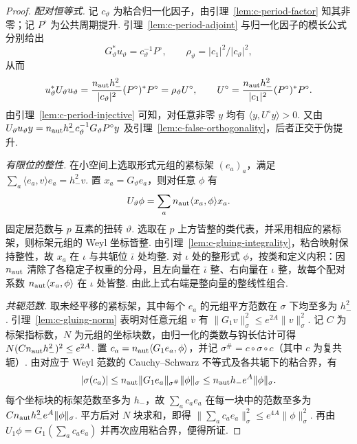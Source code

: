 \begin{proof}
\emph{配对恒等式.}
记 $c_\vartheta$ 为粘合归一化因子，由引理~\ref{lem:c-period-factor} 知其非零；记 $P^\circ$ 为公共周期提升. 引理~\ref{lem:c-period-adjoint} 与归一化因子的模长公式分别给出
\[
 G_\vartheta^*u_\vartheta=c_\vartheta^{-1}P^\circ,
 \qquad
 \rho_\vartheta=|c_1|^2/|c_\vartheta|^2 ,
\]
从而
\[
 u_\vartheta^*U_\vartheta u_\vartheta
  =\frac{n_{\rm aut}h_-^2}{|c_\vartheta|^2}(P^\circ)^*P^\circ
  =\rho_\vartheta U^\circ,\qquad
 U^\circ=\frac{n_{\rm aut}h_-^2}{|c_1|^2}(P^\circ)^*P^\circ .
\]
由引理~\ref{lem:c-period-injective} 可知，对任意非零 $y$ 均有 $\langle y,U^\circ y\rangle>0$. 又由 $U_\vartheta u_\vartheta y=n_{\rm aut}h_-^2 c_\vartheta^{-1}G_\vartheta P^\circ y$ 及引理~\ref{lem:c-false-orthogonality}，后者正交于伪提升.

\emph{有限位的整性.}
在小空间上选取形式元组的紧标架 $(e_a)_a$，满足 $\sum_a\langle e_a,v\rangle e_a=h_-^2v$. 置 $x_a=G_\vartheta e_a$，则对任意 $\phi$ 有
\[
 U_\vartheta\phi=\sum_a n_{\rm aut}\langle x_a,\phi\rangle x_a .
\]
固定层范数与 $p$ 互素的扭转 $\vartheta$. 选取在 $p$ 上方皆整的类代表，并采用相应的紧标架，则标架元组的 Weyl 坐标皆整. 由引理~\ref{lem:c-gluing-integrality}，粘合映射保持整性，故 $x_a$ 在 $\iota$ 与共轭位 $\bar\iota$ 处均整. 对 $\iota$ 处的整形式 $\phi$，按类和定义内积：因 $n_{\rm aut}$ 清除了各稳定子权重的分母，且左向量在 $\bar\iota$ 整、右向量在 $\iota$ 整，故每个配对系数 $n_{\rm aut}\langle x_a,\phi\rangle$ 在 $\iota$ 处皆整. 由此上式右端是整向量的整线性组合.

\emph{共轭范数.}
取未经平移的紧标架，其中每个 $e_a$ 的元组平方范数在 $\sigma$ 下均至多为 $h_-^2$. 引理~\ref{lem:c-gluing-norm} 表明对任意元组 $v$ 有 $\|G_1v\|_\sigma^2\le e^{2A}\|v\|_\sigma^2$. 记 $C$ 为标架指标数，$N$ 为元组的坐标块数，由归一化的类数与钩长估计可得 $N(Cn_{\rm aut}h_-^2)^2\le e^{2A}$. 置 $c_a=n_{\rm aut}\langle G_1e_a,\phi\rangle$，并记 $\sigma^\#=c\circ\sigma\circ c$（其中 $c$ 为复共轭）. 由对应于 Weyl 范数的 Cauchy--Schwarz 不等式及各共轭下的粘合界，有
\[
 |\sigma(c_a)|\le n_{\rm aut}\|G_1e_a\|_{\sigma^\#}\|\phi\|_\sigma
             \le n_{\rm aut}h_-e^A\|\phi\|_\sigma .
\]
每个坐标块的标架范数至多为 $h_-$，故 $\sum_a c_a e_a$ 在每一块中的范数至多为 $Cn_{\rm aut}h_-^2e^A\|\phi\|_\sigma$. 平方后对 $N$ 块求和，即得 $\|\sum_a c_a e_a\|_\sigma^2\le e^{4A}\|\phi\|_\sigma^2$. 再由 $U_1\phi=G_1(\sum_a c_a e_a)$ 并再次应用粘合界，便得所证.
\end{proof}

